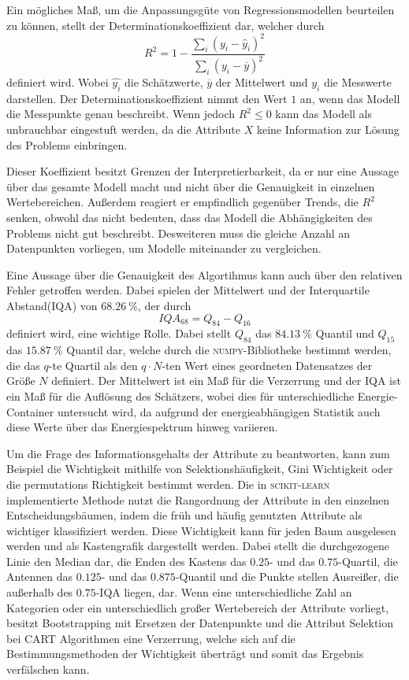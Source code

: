 Ein mögliches Maß, um die Anpassungsgüte von Regressionsmodellen beurteilen zu können, stellt der Determinationskoeffizient dar, welcher
durch
\begin{equation}
  R^2 = 1 - \frac{\sum_i (y_i-\hat{y}_i)^2}{\sum_i (y_i - \overline{y})^2}
\end{equation}
definiert wird. Wobei $\hat{y_i}$ die Schätzwerte, $\overline{y}$ der Mittelwert und $y_i$ die Messwerte darstellen.
Der Determinationskoeffizient nimmt den Wert $1$ an, wenn das Modell die Messpunkte genau beschreibt. Wenn jedoch
$R^2 \leq 0$ kann das Modell als unbrauchbar eingestuft werden, da die Attribute $X$ keine Information zur
Lösung des Problems einbringen.

Dieser Koeffizient besitzt Grenzen der Interpretierbarkeit, da er nur eine Aussage über das gesamte Modell macht und
nicht über die Genauigkeit in einzelnen Wertebereichen.
Außerdem reagiert er empfindlich gegenüber Trends, die $R^2$ senken, obwohl das nicht bedeuten, dass das Modell die Abhängigkeiten des Problems
nicht gut beschreibt.
Desweiteren muss die gleiche Anzahl an Datenpunkten vorliegen, um Modelle
miteinander zu vergleichen.

Eine Aussage über die Genauigkeit des Algortihmus kann auch über den relativen Fehler getroffen werden. Dabei spielen der Mittelwert und der
Interquartile Abstand(IQA) von $\SI{68.26}{\percent}$, der durch
\begin{equation}
  IQA_{68} = Q_{84}-Q_{16}
\end{equation}
definiert wird, eine wichtige Rolle.
Dabei stellt $Q_{84}$ das $\SI{84.13}{\percent}$ Quantil und $Q_{15}$ das $\SI{15.87}{\percent}$ Quantil dar, welche durch die \textsc{numpy}-Bibliotheke\cite{scipy}
bestimmt werden, die das $q$-te Quartil als den $q \cdot N$-ten Wert eines geordneten Datensatzes der Größe $N$ definiert.
Der Mittelwert ist ein Maß für die Verzerrung und der IQA ist ein Maß für die Auflösung des Schätzers, wobei dies für unterschiedliche
Energie-Container untersucht wird, da aufgrund der energieabhängigen Statistik auch diese Werte über das Energiespektrum hinweg variieren.

Um die Frage des Informationsgehalts der Attribute zu beantworten, kann zum Beispiel die Wichtigkeit mithilfe von Selektionshäufigkeit, Gini Wichtigkeit oder
die permutations Richtigkeit bestimmt werden.
Die in \textsc{scikit-learn} implementierte Methode nutzt die Rangordnung der Attribute in den einzelnen Entscheidungsbäumen, indem die früh und häufig genutzten Attribute
als wichtiger klassifiziert werden.
Diese Wichtigkeit kann für jeden Baum ausgelesen werden und als Kastengrafik dargestellt werden.
Dabei stellt die durchgezogene Linie den Median dar, die Enden des Kastens das $\num{0.25}$- und das $\num{0.75}$-Quartil, die Antennen das $\num{0.125}$- und das
$\num{0.875}$-Quantil und die Punkte stellen Ausreißer, die außerhalb des $\num{0.75}$-IQA liegen, dar.
Wenn eine unterschiedliche Zahl an Kategorien oder ein unterschiedlich großer Wertebereich der Attribute vorliegt, besitzt Bootstrapping mit Ersetzen der Datenpunkte
und die Attribut Selektion bei CART Algorithmen eine Verzerrung, welche sich auf die Bestimmungsmethoden der Wichtigkeit überträgt und somit das Ergebnis verfälschen
kann\cite{feature_importance}.
